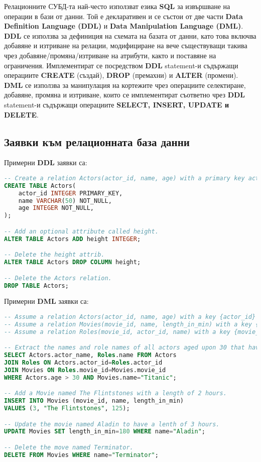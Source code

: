 \documentclass[fleqn,12pt]{article}
\begin{document}
Релационните СУБД-та най-често използват езика \textbf{SQL} за извършване на операции в бази от данни.
Той е декларативен и се състои от две части \textbf{Data Definition Language (DDL)} и \textbf{Data Manipulation Language (DML)}.
\bigbreak
\textbf{DDL} се използва за дефиниция на схемата на базата от данни, като това включва добавяне и изтриване на релации, модифициране на вече съществуващи такива чрез добавяне/промяна/изтриване на атрибути, както и поставяне на ограничения.
Имплементират се посредством \textbf{DDL} statement-и съдържащи операциите \textbf{CREATE} (създай), \textbf{DROP} (премахни) и \textbf{ALTER} (промени).
\bigbreak
\textbf{DML} се използва за манипулация на кортежите чрез операциите селектиране, добавяне, промяна и изтриване, които се имплементират съответно чрез \textbf{DDL} statement-и съдържащи операциите \textbf{SELECT, INSERT, UPDATE и DELETE}.

\subsection{Заявки към релационната база данни}

\bigbreak
Примерни \textbf{DDL} заявки са:

\begin{lstlisting}[language=SQL, caption=DLL queries example]
-- Create a relation Actors(actor_id, name, age) with a primary key actor_id.
CREATE TABLE Actors(
    actor_id INTEGER PRIMARY_KEY,
    name VARCHAR(50) NOT_NULL,
    age INTEGER NOT_NULL,
);

-- Add an optional attribute called height.
ALTER TABLE Actors ADD height INTEGER;

-- Delete the height attrib.
ALTER TABLE Actors DROP COLUMN height;

-- Delete the Actors relation.
DROP TABLE Actors;
\end{lstlisting}


Примерни \textbf{DML} заявки са:

\begin{lstlisting}[language=SQL, caption=DML queries example]
-- Assume a relation Actors(actor_id, name, age) with a key {actor_id}
-- Assume a relation Movies(movie_id, name, length_in_min) with a key {movie_id}
-- Assume a relation Roles(movie_id, actor_id, name) with a key {movie_id, actor_id}

-- Extract the names and role names of all actors aged upon 30 that have participated in Titanic.
SELECT Actors.actor_name, Roles.name FROM Actors
JOIN Roles ON Actors.actor_id=Roles.actor_id
JOIN Movies ON Roles.movie_id=Movies.movie_id
WHERE Actors.age > 30 AND Movies.name="Titanic";

-- Add a Movie named The Flintstones with a length of 2 hours.
INSERT INTO Movies (movie_id, name, length_in_min)
VALUES (3, "The Flintstones", 125);

-- Update the movie named Aladin to have a lenth of 3 hours.
UPDATE Movies SET length_in_min=180 WHERE name="Aladin";

-- Delete the move named Terminator.
DELETE FROM Movies WHERE name="Terminator";
\end{lstlisting}
\end{document}
